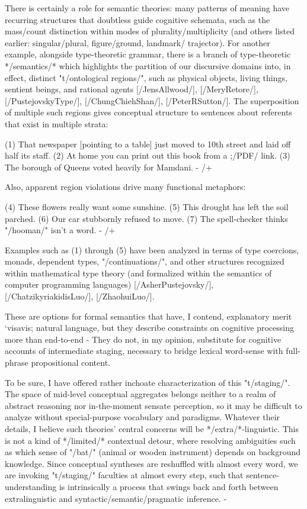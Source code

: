 There is certainly a role for semantic theories: 
many patterns of meaning have recurring structures 
that doubtless guide cognitive schemata, 
such as the mass/count distinction within modes 
of plurality/multiplicity (and others listed earlier: 
singular/plural, figure/ground, landmark/ trajector).   
For another example, alongside type-theoretic 
grammar, there is a branch of type-theoretic 
*/semantics/* which highlights the partition 
of our discursive domains into, in effect, 
distinct "t/ontological regions/", such as 
physical objects, living things, sentient 
beings, and rational agents [/JensAllwood/], [/MeryRetore/], 
[/PustejovskyType/], [/ChungChiehShan/],  
[/PeterRSutton/].  The superposition of 
multiple such regions gives conceptual structure 
to sentences about referents that exist in multiple strata:

(1)  That newspaper [pointing to a table] just moved to 10th street 
and laid off half its staff.
(2)  At home you can print out this book from a ;/PDF/ link.
(3)  The borough of Queens voted heavily for Mamdani. -%
/+

Also, apparent region violations drive many functional metaphors:

(4)  These flowers really want some sunshine.
(5)  This drought has left the soil parched.
(6)  Our car stubbornly refused to move.
(7)  The spell-checker thinks "/hooman/" isn't a word. -%
/+

Examples such as (1) through (5) have been analyzed in terms of 
type coercions, monads, dependent types, "/continuations/", and 
other structures recognized within mathematical type theory (and 
formalized within the semantics of computer programming languages)
[/AsherPustejovsky/], [/ChatzikyriakidisLuo/], [/ZhaohuiLuo/].

These are options for formal semantics that have, I contend, 
explanatory merit `visavis; natural language, but they describe 
constraints on cognitive processing more than end-to-end 
 -%
They do not, in my opinion, substitute for cognitive 
accounts of intermediate staging, necessary 
to bridge lexical word-sense with full-phrase propositional content.

To be sure, I have offered rather inchoate characterization 
of this "t/staging/".  The space of mid-level conceptual 
aggregates belongs neither to a realm of abstract reasoning nor 
in-the-moment sensate perception, so it may be difficult to 
analyze without special-purpose vocabulary and paradigms.  
Whatever their details, I believe such theories' central 
concerns will be */extra/*-linguistic.  This is not a kind 
of */limited/* contextual detour, where resolving 
ambiguities such as which sense of "/bat/" (animal or wooden instrument) depends on 
background knowledge.  Since conceptual syntheses are 
reshuffled with almost every word, we are  
invoking "t/staging/" faculties at almost every  
step, such that sentence-understanding is intrinsically a 
process that swings back and forth between 
extralinguistic and syntactic/semantic/pragmatic 
inference.  -%


